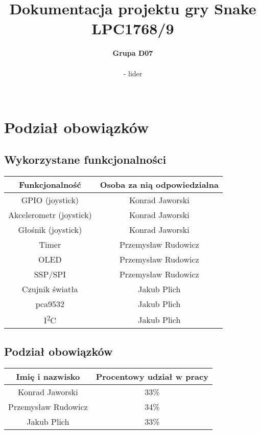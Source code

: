 \documentclass{classrep}
\author{%
	\textbf{Grupa D07}\\\\
	\studentinfo[216879@edu.p.lodz.pl]{Przemysław Rudowicz}{216879} - lider\\
	\studentinfo[216782@edu.p.lodz.pl]{Konrad Jaworski}{216782}\\
	\studentinfo[216866@edu.p.lodz.pl]{Jakub Plich}{216866}%
}
\title{Dokumentacja projektu gry Snake\\
		LPC1768/9}
\begin{document}
	\thispagestyle{fancyplain}
	\maketitle
	

	
	\newpage
	\tableofcontents
	\newpage
	
	\section{Podział obowiązków}
	{
	\subsection{Wykorzystane funkcjonalności}
		\begin{center}
			\begin{tabular}{|c|c|}
				\hline 
				\textbf{Funkcjonalność} & \textbf{Osoba za nią odpowiedzialna} \\ 
				\hline 
				GPIO (joystick) & Konrad Jaworski \\ 
				\hline 
				Akcelerometr (joystick) & Konrad Jaworski \\ 
				\hline 
				Głośnik (joystick) & Konrad Jaworski \\ 
				\hline 
				Timer & Przemysław Rudowicz \\ 
				\hline 
				OLED & Przemysław Rudowicz \\ 
				\hline 
				SSP/SPI & Przemysław Rudowicz \\ 
				\hline 
				Czujnik światła & Jakub Plich \\ 
				\hline 
				pca9532 & Jakub Plich \\ 
				\hline 
				I\textsuperscript{2}C & Jakub Plich \\ 
				\hline 
			\end{tabular} 	
		\end{center}
	}

	\subsection{Podział obowiązków}
\begin{center}
			\begin{tabular}{|c|c|}
			\hline 
			\textbf{Imię i nazwisko} & \textbf{Procentowy udział w pracy} \\ 
			\hline 
			Konrad Jaworski & 33\% \\ 
			\hline 
			Przemysław Rudowicz & 34\% \\ 
			\hline 
			Jakub Plich & 33\% \\ 
			\hline 
		\end{tabular} 
\end{center}
\end{document}
